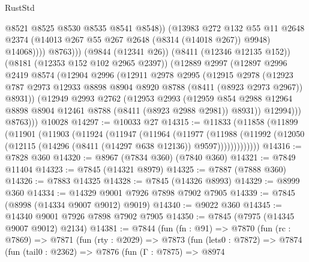 \begin{lexlean}{RustStd}
\begin{coremodule}
                      @8521
                      @8525
                      @8530
                      @8535
                      @8541
                      @8548))
                  (@13983
                    @272
                    @132
                    @55
                    @11
                    @2648
                    @2374
                    (@14013 @267 @55 @267 @2648 (@8314 (@14018 @267)) @9948)
                    @14068))))
            @8763)))
      (@9844 (@12341 @26))
      (@8411 (@12346 @12135 @152))
      (@8181 (@12353 @152 @102 @2965 @2397))
      (@12889
        @2997
        (@12897
          @2996
          @2419
          @8574
          (@12904
            @2996
            (@12911
              @2978
              @2995
              (@12915
                @2978
                (@12923
                  @787
                  @2973
                  @12933
                  @8898
                  @8904
                  @8920
                  @8788
                  (@8411 (@8923 @2973 @2967))
                  @8931))
              (@12949
                @2993
                @2762
                (@12953
                  @2993
                  (@12959
                    @854
                    @2988
                    @12964
                    @8898
                    @8904
                    @12461
                    @8788
                    (@8411 (@8923 @2988 @2981))
                    @8931))
                @12994)))
          @8763)))
    @10028
@14297 := @10033 @27
@14315 := @11833
    (@11858
      (@11899
        (@11901
          (@11903
            (@11924
              (@11947
                (@11964
                  (@11977
                    (@11988
                      (@11992
                        (@12050 (@12115 (@14296 (@8411 (@14297 @638 @12136)) @9597)))))))))))))
@14316 := @7828 @360
@14320 := @8967 (@7834 @360) (@7840 @360)
@14321 := @7849 @11404
@14323 := @7845 (@14321 @8979)
@14325 := @7887 (@7888 @360)
@14326 := @7883 @14325
@14328 := @7845 (@14326 @8993)
@14329 := @8999 @360
@14334 := @14329 @9001 @7926 @7898 @7902 @7905
@14339 := @7845 (@8998 (@14334 @9007 @9012) @9019)
@14340 := @9022 @360
@14345 := @14340 @9001 @7926 @7898 @7902 @7905
@14350 := @7845 (@7975 (@14345 @9007 @9012) @2134)
@14381 := @7844
    (fun (fn : @91) =>
    @7870
      (fun (rc : @7869) =>
      @7871
        (fun (rty : @2029) =>
        @7873
          (fun (lets0 : @7872) =>
          @7874
            (fun (tail0 : @2362) =>
            @7876
              (fun (Γ : @7875) =>
              @8974

\end{coremodule}
\end{lexlean}
